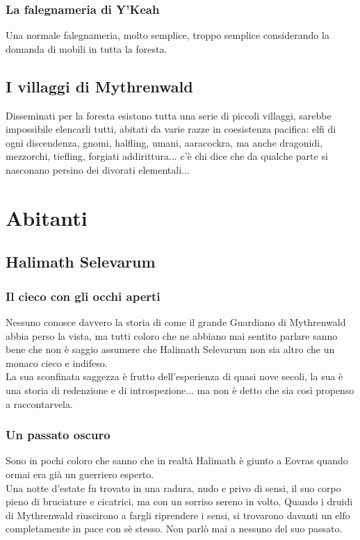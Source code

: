 \subsubsection{La falegnameria di Y'Keah} Una normale falegnameria, molto semplice, troppo semplice considerando la domanda di mobili in tutta la foresta.

\subsection{I villaggi di Mythrenwald}

Disseminati per la foresta esistono tutta una serie di piccoli villaggi, sarebbe impossibile elencarli tutti, abitati da varie razze in coesistenza pacifica: elfi di ogni discendenza, gnomi, halfling, umani, aaracockra, ma anche dragonidi, mezzorchi, tiefling, forgiati addirittura... c'è chi dice che da qualche parte si nasconano persino dei divorati elementali...

\section{Abitanti}

\subsection{Halimath Selevarum}

\subsubsection{Il cieco con gli occhi aperti}

Nessuno conosce davvero la storia di come il grande Guardiano di Mythrenwald abbia perso la vista, ma tutti coloro che ne abbiano mai sentito parlare sanno bene che non è saggio assumere che Halimath Selevarum non sia altro che un monaco cieco e indifeso. \\ La sua sconfinata saggezza è frutto dell'esperienza di quasi nove secoli, la sua è una storia di redenzione e di introspezione... ma non è detto che sia così propenso a raccontarvela.

\subsubsection{Un passato oscuro}

Sono in pochi coloro che sanno che in realtà Halimath è giunto a Eovras quando ormai era già un guerriero esperto. \\ Una notte d'estate fu trovato in una radura, nudo e privo di sensi, il suo corpo pieno di bruciature e cicatrici, ma con un sorriso sereno in volto. Quando i druidi di Mythrenwald riuscirono a fargli riprendere i sensi, si trovarono davanti un elfo completamente in pace con sè stesso. Non parlò mai a nessuno del suo passato.

